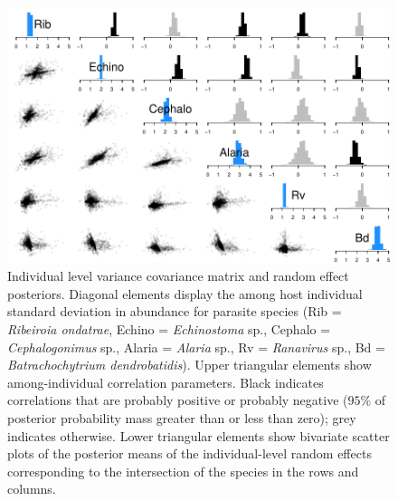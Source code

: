 \begin{figure}[ht]\centering
\includegraphics[width=\linewidth]{figs/ch4/amg_indiv}
\caption[Individual level variance covariance matrix and random effect posteriors]{Individual level variance covariance matrix and random effect posteriors. Diagonal elements display the among host individual standard deviation in abundance for parasite species (Rib = \textit{Ribeiroia ondatrae}, Echino = \textit{Echinostoma} sp., Cephalo = \textit{Cephalogonimus} sp., Alaria = \textit{Alaria} sp., Rv = \textit{Ranavirus} sp., Bd = \textit{Batrachochytrium dendrobatidis}). Upper triangular elements show among-individual correlation parameters. Black indicates correlations that are probably positive or probably negative ($95\%$ of posterior probability mass greater than or less than zero); grey indicates otherwise. Lower triangular elements show bivariate scatter plots of the posterior means of the individual-level random effects corresponding to the intersection of the species in the rows and columns.}
\label{fig:amg_indiv}
\end{figure}

